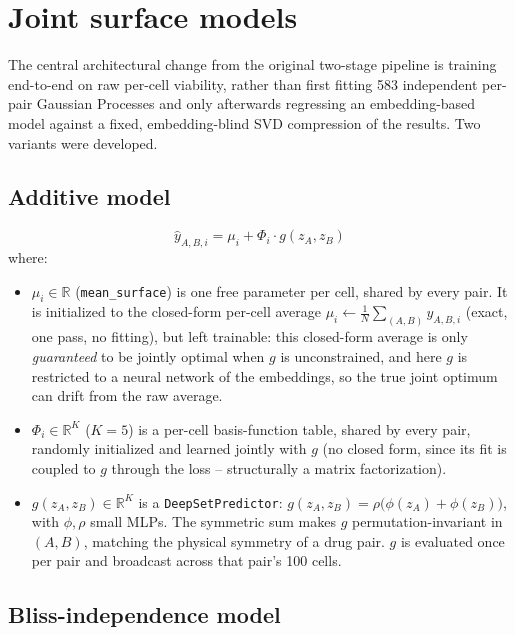 \documentclass[11pt]{article}
\begin{document}
\section{Joint surface models}

The central architectural change from the original two-stage pipeline is training end-to-end on raw per-cell viability, rather than first fitting 583 independent per-pair Gaussian Processes and only afterwards regressing an embedding-based model against a fixed, embedding-blind SVD compression of the results. Two variants were developed.

\subsection{Additive model}

\begin{equation}
\hat{y}_{A,B,i} = \mu_i + \Phi_i \cdot g(z_A, z_B)
\end{equation}
where:
\begin{itemize}
\item $\mu_i \in \mathbb{R}$ (\texttt{mean\_surface}) is one free parameter per cell, shared by every pair. It is initialized to the closed-form per-cell average $\mu_i \leftarrow \frac{1}{N}\sum_{(A,B)} y_{A,B,i}$ (exact, one pass, no fitting), but left trainable: this closed-form average is only \emph{guaranteed} to be jointly optimal when $g$ is unconstrained, and here $g$ is restricted to a neural network of the embeddings, so the true joint optimum can drift from the raw average.
\item $\Phi_i \in \mathbb{R}^K$ ($K=5$) is a per-cell basis-function table, shared by every pair, randomly initialized and learned jointly with $g$ (no closed form, since its fit is coupled to $g$ through the loss -- structurally a matrix factorization).
\item $g(z_A, z_B) \in \mathbb{R}^K$ is a \texttt{DeepSetPredictor}: $g(z_A, z_B) = \rho\big(\phi(z_A) + \phi(z_B)\big)$, with $\phi, \rho$ small MLPs. The symmetric sum makes $g$ permutation-invariant in $(A,B)$, matching the physical symmetry of a drug pair. $g$ is evaluated once per pair and broadcast across that pair's 100 cells.
\end{itemize}

\subsection{Bliss-independence model}
\end{document}

